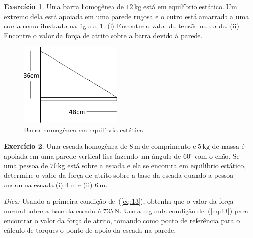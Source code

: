 \documentclass[papersize=a4,DIV=calc,twocolumn=on]{scrartcl}
\theoremstyle{definition}
\newtheorem{ex}{Exercício}[section]
\begin{document}
\begin{ex}
  Uma barra homogênea de $12\,\mathrm{kg}$ está em equilíbrio
  estático. Um extremo dela está apoiada em uma parede rugosa e o
  outro está amarrado a uma corda como ilustrado na
  figura~\ref{fig:barra_equilibrio}. (i) Encontre o valor da tensão na
  corda. (ii) Encontre o valor da força de atrito sobre a barra devido
  à parede.
  \begin{figure}[ht]
    \centering
    \includegraphics[width=0.45\textwidth,keepaspectratio]{barra_equilibrio.pdf}
    \caption{Barra homogênea em equilíbrio estático.}
    \label{fig:barra_equilibrio}
  \end{figure}
\end{ex}

\begin{ex}
  Uma escada homogênea de $8\,\mathrm{m}$ de comprimento e
  $5\,\mathrm{kg}$ de massa é apoiada em uma parede vertical lisa
  fazendo um ângulo de $60^\circ$ com o chão. Se uma pessoa de
  $70\,\mathrm{kg}$ está sobre a escada e ela se encontra em
  equilíbrio estático, determine o valor da força de atrito sobre a
  base da escada quando a pessoa andou na escada (i) $4\,\mathrm{m}$ e
  (ii) $6\,\mathrm{m}$.

  \noindent\textit{Dica:} Usando a primeira condição de~(\ref{eq:13}), obtenha
  que o valor da força normal sobre a base da escada é
  $735\,\mathrm{N}$. Use a segunda condição de~(\ref{eq:13}) para
  encontrar o valor da força de atrito, tomando como ponto de
  referência para o cálculo de torques o ponto de apoio da escada na
  parede.
\end{ex}
\end{document}
